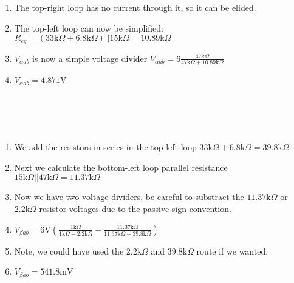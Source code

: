 \documentclass[12pt]{article}
\def\k{\mathrm{k}}
\def\V{\mathrm{V}}
\def\m{\mathrm{m}}
\begin{document}
\begin{multicols}{2}
	\begin{enumerate}
		\item The top-right loop has no current through it, so it can be elided.
		\item The top-left loop can now be simplified: $R_{eq}=(33\k\Omega+6.8\k\Omega)||15\k\Omega=10.89\k\Omega$
		\item $V_{\alpha ab}$ is now a simple voltage divider $\displaystyle{V_{\alpha ab}=6\frac{47\k\Omega}{47\k\Omega+10.89\k\Omega}}$
		\item $V_{\alpha ab}=4.871\V$
		      \\
		      \\
		      \\
		      \\
		      \\
	\end{enumerate}
	\begin{enumerate}
		\item We add the resistors in series in the top-left loop $33\k\Omega+6.8\k\Omega=39.8\k\Omega$
		\item Next we calculate the bottom-left loop parallel resistance $15\k\Omega||47\k\Omega=11.37\k\Omega$
		\item Now we have two voltage dividers, be careful to substract the $11.37\k\Omega$ or $2.2\k\Omega$ resistor voltages due to the passive sign convention.
		\item $\displaystyle{V_{\beta ab}=6\V\left(\frac{1\k\Omega}{1\k\Omega+2.2\k\Omega}-\frac{11.37\k\Omega}{11.37\k\Omega+39.8\k\Omega}\right)}$
		\item Note, we could have used the $2.2\k\Omega$ and $39.8\k\Omega$ route if we wanted.
		\item $V_{\beta ab}=541.8\m\V$
	\end{enumerate}
\end{multicols}
\end{document}
